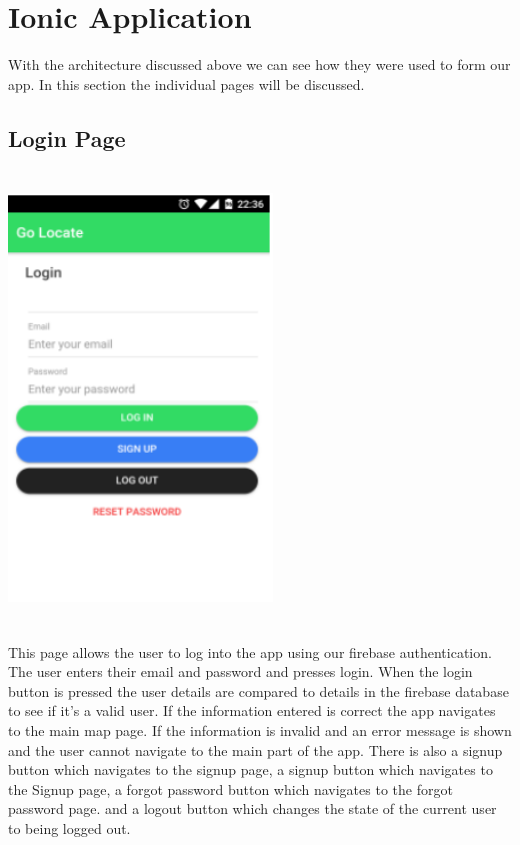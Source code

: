 \section{Ionic Application}
With the architecture discussed above we can see how they were used to form our app. In this section the individual pages will be discussed.

\subsection{Login Page}

\begin{center}    
	\includegraphics[width=7cm, height=12cm]{img/loginpage.png}
\end{center}

This page allows the user to log into the app using our firebase authentication. The user enters their email and password and presses login. When the login button is pressed the user details are compared to details in the firebase database to see if it’s a valid user. If the information entered is correct the app navigates to the main map page. If the information is invalid and an error message is shown and the user cannot navigate to the main part of the app. There is also a signup button which navigates to the signup page, a signup button which navigates to the Signup page, a forgot password button which navigates to the forgot password page. and a logout button which changes the state of the current user to being logged out. 

